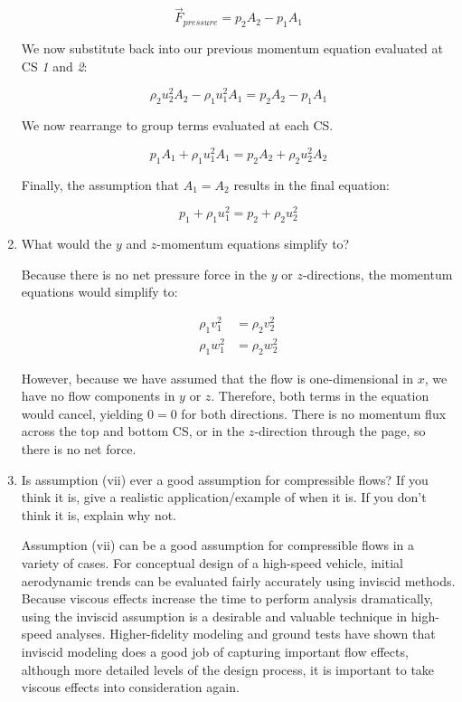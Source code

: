 \documentclass[../main.tex]{subfiles}
\begin{document}
\begin{enumerate}[label = (\alph*)]
        \[
            \vec{F}_{pressure} = p_2 A_2 - p_1 A_1   
        \]

        We now substitute back into our previous momentum equation evaluated at CS \textit{1} and \textit{2}:

        \[
            \rho_2 u_2^2 A_2 - \rho_1 u_1^2 A_1 =%
            p_2 A_2 - p_1 A_1
        \]

        We now rearrange to group terms evaluated at each CS.

        \[
            p_1 A_1 + \rho_1 u_1^2 A_1 =%
            p_2 A_2 + \rho_2 u_2^2 A_2  
        \] 

        Finally, the assumption that \(A_1 = A_2\) results in the final equation:

        \[
            \boxed{
            p_1 + \rho_1 u_1^2 =%
            p_2 + \rho_2 u_2^2   
            }
        \] 

    \item
        What would the $y$ and $z$-momentum equations simplify to?

        Because there is no net pressure force in the \(y\) or \(z\)-directions, the momentum equations would simplify to:

        \begin{align*}
            \rho_1 v_1^2 &= \rho_2 v_2^2\\
            \rho_1 w_1^2 &= \rho_2 w_2^2
        \end{align*}

        However, because we have assumed that the flow is one-dimensional in \(x\), we have no flow components in \(y\) or \(z\).
        Therefore, both terms in the equation would cancel, yielding \(0=0\) for both directions.
        There is no momentum flux across the top and bottom CS, or in the \(z\)-direction through the page, so there is no net force.

    \item
        Is assumption (vii) ever a good assumption for compressible flows?
        If you think it is, give a realistic application/example of when it is.
        If you don't think it is, explain why not.

        Assumption (vii) can be a good assumption for compressible flows in a variety of cases. 
        For conceptual design of a high-speed vehicle, initial aerodynamic trends can be evaluated fairly accurately using inviscid methods. 
        Because viscous effects increase the time to perform analysis dramatically, using the inviscid assumption is a desirable and valuable technique in high-speed analyses.
        Higher-fidelity modeling and ground tests have shown that inviscid modeling does a good job of capturing important flow effects, although more detailed levels of the design process, it is important to take viscous effects into consideration again.


\end{enumerate}
\end{document}
